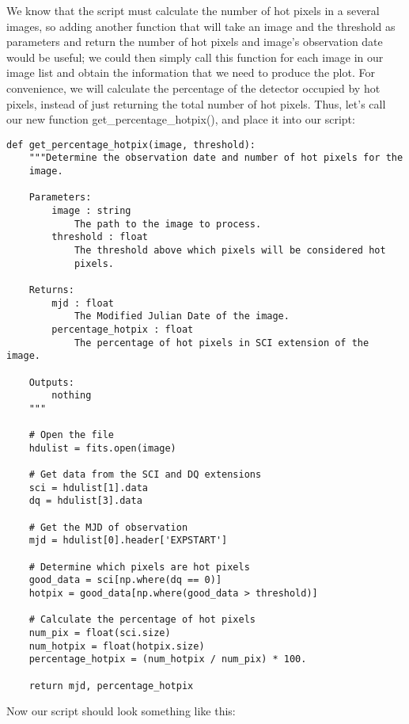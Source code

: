 We know that the script must calculate the number of hot pixels in a
several images, so adding another function that will take an image and
the threshold as parameters and return the number of hot pixels and image's 
observation date would be useful; we could then simply call this function for
each image in our image list and obtain the information that we need to produce
the plot.  For convenience, we will calculate the percentage of the detector 
occupied by hot pixels, instead of just returning the total number of hot pixels.  
Thus, let's call our new function {\sf\small get\_percentage\_hotpix()}, 
and place it into our script:

\begin{verbatim}
def get_percentage_hotpix(image, threshold):
    """Determine the observation date and number of hot pixels for the
    image.

    Parameters:
        image : string
            The path to the image to process.
        threshold : float
            The threshold above which pixels will be considered hot
            pixels.

    Returns:
        mjd : float
            The Modified Julian Date of the image.
        percentage_hotpix : float
            The percentage of hot pixels in SCI extension of the image.

    Outputs:
        nothing
    """

    # Open the file
    hdulist = fits.open(image)

    # Get data from the SCI and DQ extensions
    sci = hdulist[1].data
    dq = hdulist[3].data

    # Get the MJD of observation
    mjd = hdulist[0].header['EXPSTART']

    # Determine which pixels are hot pixels
    good_data = sci[np.where(dq == 0)]
    hotpix = good_data[np.where(good_data > threshold)]

    # Calculate the percentage of hot pixels
    num_pix = float(sci.size)
    num_hotpix = float(hotpix.size)
    percentage_hotpix = (num_hotpix / num_pix) * 100.

    return mjd, percentage_hotpix
\end{verbatim}

Now our script should look something like this:

